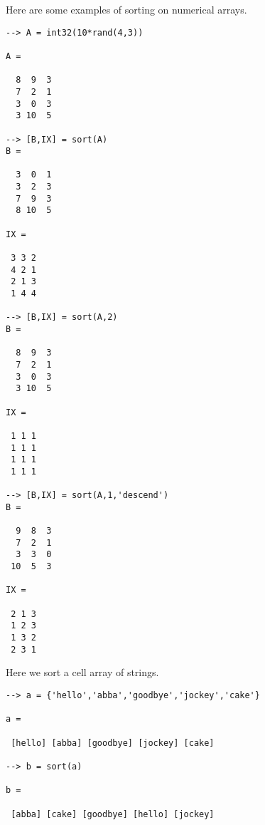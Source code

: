 Here are some examples of sorting on numerical arrays.
\begin{verbatim}
--> A = int32(10*rand(4,3))

A = 

  8  9  3 
  7  2  1 
  3  0  3 
  3 10  5 

--> [B,IX] = sort(A)
B = 

  3  0  1 
  3  2  3 
  7  9  3 
  8 10  5 

IX = 

 3 3 2 
 4 2 1 
 2 1 3 
 1 4 4 

--> [B,IX] = sort(A,2)
B = 

  8  9  3 
  7  2  1 
  3  0  3 
  3 10  5 

IX = 

 1 1 1 
 1 1 1 
 1 1 1 
 1 1 1 

--> [B,IX] = sort(A,1,'descend')
B = 

  9  8  3 
  7  2  1 
  3  3  0 
 10  5  3 

IX = 

 2 1 3 
 1 2 3 
 1 3 2 
 2 3 1 
\end{verbatim}
Here we sort a cell array of strings.
\begin{verbatim}
--> a = {'hello','abba','goodbye','jockey','cake'}

a = 

 [hello] [abba] [goodbye] [jockey] [cake] 

--> b = sort(a)

b = 

 [abba] [cake] [goodbye] [hello] [jockey] 
\end{verbatim}
